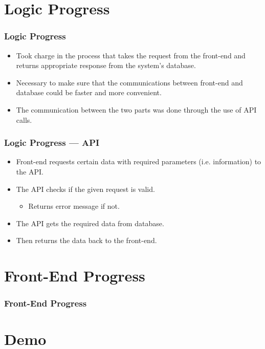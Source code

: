 \documentclass[aspectratio=169, t]{beamer}
\begin{document}
\section{Logic Progress}
\begin{frame}
  \frametitle{Logic Progress}

\begin{itemize}
    \item Took charge in the process that takes the request from the front-end and returns appropriate response from the system's database.
    \item Necessary to make sure that the communications between front-end and database could be faster and more convenient.
    \item The communication between the two parts was done through the use of API calls.
\end{itemize}

\end{frame}

\begin{frame}
    \frametitle{Logic Progress --- API}

\begin{itemize}
    \item Front-end requests certain data with required parameters (i.e. information) to the API.
    \item The API checks if the given request is valid.
    \begin{itemize}
        \item Returns error message if not.
    \end{itemize}
    \item The API gets the required data from database.
    \item Then returns the data back to the front-end.
\end{itemize}

\end{frame}

\section{Front-End Progress}
\begin{frame}
  \frametitle{Front-End Progress}

  

\end{frame}

\section{Demo}

\section{}
\maketitle
\end{document}
